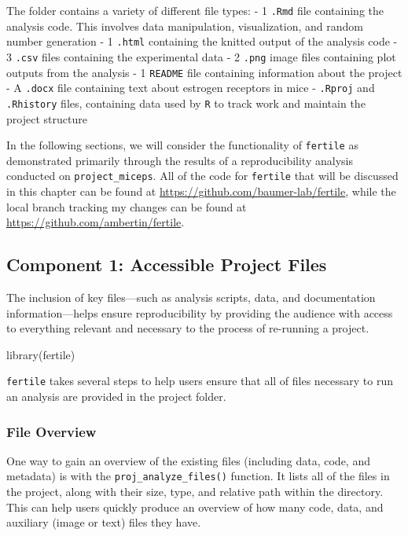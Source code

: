 \documentclass[12pt,twoside]{reedthesis}
\newenvironment{Shaded}{\begin{snugshade}}{\end{snugshade}}
\newcommand{\FunctionTok}[1]{\textcolor[rgb]{0.00,0.00,0.00}{#1}}
\newcommand{\NormalTok}[1]{#1}
\begin{document}
The folder contains a variety of different file types:
- 1 \texttt{.Rmd} file containing the analysis code. This involves data manipulation, visualization, and random number generation
- 1 \texttt{.html} containing the knitted output of the analysis code
- 3 \texttt{.csv} files containing the experimental data
- 2 \texttt{.png} image files containing plot outputs from the analysis
- 1 \texttt{README} file containing information about the project
- A \texttt{.docx} file containing text about estrogen receptors in mice
- \texttt{.Rproj} and \texttt{.Rhistory} files, containing data used by \texttt{R} to track work and maintain the project structure

In the following sections, we will consider the functionality of \texttt{fertile} as demonstrated primarily through the results of a reproducibility analysis conducted on \texttt{project\_miceps}. All of the code for \texttt{fertile} that will be discussed in this chapter can be found at \url{https://github.com/baumer-lab/fertile}, while the local branch tracking my changes can be found at \url{https://github.com/ambertin/fertile}.

\hypertarget{component-1-accessible-project-files}{%
\subsection{Component 1: Accessible Project Files}\label{component-1-accessible-project-files}}

The inclusion of key files---such as analysis scripts, data, and documentation information---helps ensure reproducibility by providing the audience with access to everything relevant and necessary to the process of re-running a project.
\begin{Shaded}
\begin{Highlighting}[]
\FunctionTok{library}\NormalTok{(fertile)}
\end{Highlighting}
\end{Shaded}
\texttt{fertile} takes several steps to help users ensure that all of files necessary to run an analysis are provided in the project folder.

\hypertarget{file-overview}{%
\subsubsection{File Overview}\label{file-overview}}

One way to gain an overview of the existing files (including data, code, and metadata) is with the \texttt{proj\_analyze\_files()} function. It lists all of the files in the project, along with their size, type, and relative path within the directory. This can help users quickly produce an overview of how many code, data, and auxiliary (image or text) files they have.
\end{document}
